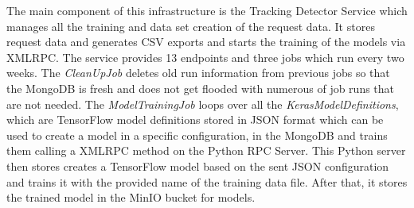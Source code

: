 The main component of this infrastructure is the Tracking Detector Service which manages all the training and data set creation of
the request data. It stores request data and generates CSV exports and starts the training of the models via XMLRPC. The service provides
13 endpoints and three jobs which run every two weeks. 
The \emph{CleanUpJob} deletes old run information from previous jobs so that the MongoDB is fresh and does not get
flooded with numerous of job runs that are not needed. The \emph{ModelTrainingJob} loops over all the \emph{KerasModelDefinitions}, which are TensorFlow
model definitions stored in JSON format which can be used to create a model in a specific configuration, in the MongoDB
and trains them calling a XMLRPC method on the Python RPC Server. This Python server then stores creates a TensorFlow model based on the sent JSON 
configuration and trains it with the provided name of the training data file. After that, it stores the trained model in the MinIO
bucket for models. 

